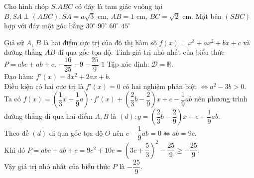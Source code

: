 \begin{ex}%
Cho hình chóp $S.ABC$ có đáy là tam giác vuông tại $B, SA\perp(ABC), SA=a\sqrt{3}$ cm, $AB=1$ cm, $BC=\sqrt{2}$ cm. Mặt bên $(SBC)$ hợp với đáy một góc bằng 
\choice
{$30^\circ$}
{$90^\circ$}
{\True $60^\circ$}
{$45^\circ$}
\loigiai
{
{}
}
\end{ex}

\begin{ex}%
Giả sử $A$, $B$ là hai điểm cực trị của đồ thị hàm số $f(x)=x^3+ax^2+bx+c$ và đường thẳng $AB$ đi qua gốc tọa độ. Tính giá trị nhỏ nhất của biểu thức $P=abc+ab+c$.
\choice
{$-\dfrac{16}{25}$}
{$-9$}
{\True $-\dfrac{25}{9}$}
{$1$}
\loigiai
{Tập xác định: $\mathscr{D}=\mathbb{R}$.\\Đạo hàm: $f'(x)=3x^2+2ax+b$.\\
Điều kiện có hai cực trị là $f'(x)=0$ có hai nghiệm phân biệt $\Leftrightarrow a^2-3b>0$.\\
Ta có $f(x)=\left(\dfrac{1}{3}x+\dfrac{1}{9}a\right)\cdot f'(x)+\left(\dfrac{2}{3}b-\dfrac{2}{9}\right)x+c-\dfrac{1}{9}ab$ nên phương trình đường thẳng đi qua hai điểm $A, B$ là $(d): y=\left(\dfrac{2}{3}b-\dfrac{2}{9}\right)x+c-\dfrac{1}{9}ab$.\\Theo đề $(d)$ đi qua gốc tọa độ $O$ nên $c-\dfrac{1}{9}ab=0\Leftrightarrow ab=9c$.\\Khi đó $P=abc+ab+c=9c^2+10c=\left(3c+\dfrac{5}{3}\right)^2-\dfrac{25}{9}\geq -\dfrac{25}{9}$.\\Vậy giá trị nhỏ nhất của biểu thức $P$ là $-\dfrac{25}{9}$.}
\end{ex}

